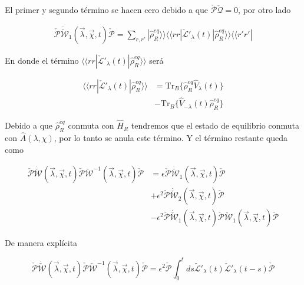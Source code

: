\begin{appendixs}
El primer y segundo término se hacen cero debido a que $\check{\mathcal{P}}\check{\mathcal{Q}}=0$, por otro lado

\begin{align*}
    \check{\mathcal{P}}\dot{\check{\mathcal{W}}}_{1}(\vec{\lambda},\vec{\chi},t)\check{\mathcal{P}} = \sum_{r,r'}|\hat{\rho}^{eq}_{R} \rangle \rangle \langle \langle rr| \check{\mathcal{L}}'_{\lambda}(t)|\hat{\rho}_{R}^{eq}\rangle \rangle \langle \langle r'r'|
\end{align*}

En donde el término $\langle \langle rr|\check{\mathcal{L}}'_{\lambda}(t)|\hat{\rho}_{R}^{eq}\rangle \rangle$ será 

\begin{align*}
    \langle \langle rr|\check{\mathcal{L}}'_{\lambda}(t)|\hat{\rho}_{R}^{eq}\rangle \rangle & = \text{Tr}_{B}\{\hat{\rho}^{eq}_{R}\hat{V}_{\lambda}(t)\} \\
                    & - \text{Tr}_{B}\{\hat{V}_{-\lambda}(t)\hat{\rho}^{eq}_{R}\}
\end{align*}

Debido a que $\hat{\rho}^{eq}_{R}$ conmuta con $\hat{H}_{R}$ tendremos que el estado de equilibrio conmuta con $\hat{A}(\lambda,\chi)$, por lo tanto se anula este término. Y el término restante queda como 

\begin{align*}
    \check{\mathcal{P}}\dot{\check{\mathcal{W}}}(\vec{\lambda},\vec{\chi},t)\check{\mathcal{P}}\check{\mathcal{W}}^{-1}(\vec{\lambda},\vec{\chi},t)\check{\mathcal{P}} & = \epsilon \check{\mathcal{P}}\dot{\check{\mathcal{W}}}_{1}(\vec{\lambda},\vec{\chi},t)\check{\mathcal{P}} \\
    & + \epsilon^{2}\check{\mathcal{P}}\dot{\check{\mathcal{W}}}_{2}(\vec{\lambda},\vec{\chi},t)\check{\mathcal{P}} \\
    & - \epsilon^{2}\check{\mathcal{P}}\dot{\check{\mathcal{W}}}_{1}(\vec{\lambda},\vec{\chi},t)\check{\mathcal{P}}  \check{\mathcal{W}}_{1}(\vec{\lambda},\vec{\chi},t) \check{\mathcal{P}}
\end{align*}

De manera explícita

\begin{equation*}
    \check{\mathcal{P}}\dot{\check{\mathcal{W}}}(\vec{\lambda},\vec{\chi},t)\check{\mathcal{P}}\check{\mathcal{W}}^{-1}(\vec{\lambda},\vec{\chi},t)\check{\mathcal{P}} = \epsilon^{2}\check{\mathcal{P}}\int_{0}^{t}ds \check{\mathcal{L}}'_{\lambda}(t)\check{\mathcal{L}}'_{\lambda}(t-s)\check{\mathcal{P}} 
\end{equation*}


\end{appendixs}
